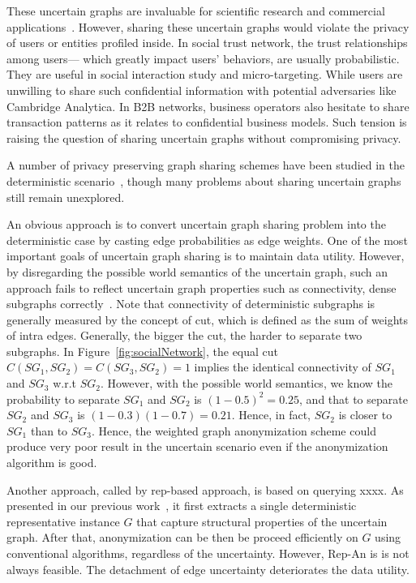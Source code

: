 These uncertain graphs are invaluable for scientific research and commercial applications~\cite{Kempe_Maximizing_2003,Cho_Friendship_2011}. However, sharing these uncertain graphs would violate the privacy of users or entities profiled inside. In social trust network, the trust relationships among users--- which greatly impact users' behaviors, are usually probabilistic.  They are useful in social interaction study and micro-targeting. While users are unwilling to share such confidential information with potential adversaries like Cambridge Analytica. In B2B networks, business operators also hesitate to share transaction patterns as it relates to  confidential business models. Such tension is raising the question of sharing uncertain graphs without compromising privacy. 


A number of privacy preserving graph sharing schemes have been studied in the deterministic scenario~\cite{Liu_Towards_2008,Ying_Randomizing_2008,Wang2011,Liu_Privacy_2009,Nguyen_Anonymizing_2015,Sala_Sharing_2011,Xiao_Differentially_2014,lee2011}, though many problems about sharing uncertain graphs still remain unexplored.  


An obvious approach is to convert uncertain graph sharing problem into the deterministic case by casting edge probabilities as edge weights. 
One of the most important goals of uncertain graph sharing is to maintain data utility. 
However, by disregarding the possible world semantics of the uncertain graph, such an approach fails to reflect uncertain graph properties such as connectivity, dense subgraphs correctly~\cite{Zhao_Detecting_2014,Hua_Probabilistic_2010}. {\small Note that connectivity of deterministic subgraphs is generally measured by the concept of cut, which is defined as the sum of weights of intra edges. Generally, the bigger the cut, the harder to separate two subgraphs. In Figure~\ref{fig:socialNetwork}, the equal cut $C(SG_{1},SG_{2})=C(SG_{3},SG_{2})=1$ implies the identical connectivity of $SG_{1}$ and $SG_{3}$ w.r.t $SG_{2}$. However, with the possible world semantics, we know the probability to separate $SG_{1}$ and $SG_{2}$ is $(1-0.5)^{2}=0.25$, and that to separate $SG_{2}$ and $SG_{3}$ is $(1-0.3)(1-0.7)=0.21$. Hence, in fact, $SG_{2}$ is closer to $SG_{1}$ than to $SG_{3}$.} 
Hence, the weighted graph anonymization scheme could produce very poor result in the uncertain scenario even if the anonymization algorithm is good.  


Another approach, called by rep-based approach, is based on querying xxxx. 
As presented in our previous work~\cite{Xiao:2018}, it first extracts a single deterministic representative
instance $G$ that capture structural properties of the uncertain
graph.
After that, anonymization can be then be proceed efficiently on $G$ using conventional algorithms, regardless of the uncertainty.  
However, Rep-An is is not always feasible. 
The detachment of edge uncertainty deteriorates the data utility. 


